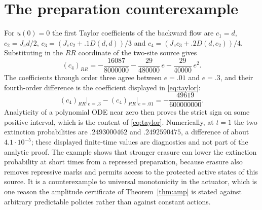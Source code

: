 \section{The preparation counterexample}
\label{app:taylor}

For $u(0)=0$ the first Taylor coefficients of the backward flow are $c_1=d$,
$c_2=J_ed/2$, $c_3=(J_ec_2+.1D(d,d))/3$ and $c_4=(J_ec_3+.2D(d,c_2))/4$.
Substituting in the $RR$ coordinate of the two-site source gives
\[
 (c_4)_{RR}=-\frac{16087}{8000000}-\frac{29}{480000}\,e
            -\frac{29}{40000}\,e^2 .
\]
The coefficients through order three agree between $e=.01$ and $e=.3$, and
their fourth-order difference is the coefficient displayed in
\eqref{eq:taylor}:
\[
 (c_4)_{RR}\big|_{e=.3}-(c_4)_{RR}\big|_{e=.01}
 =-\frac{49619}{600000000}.
\]
Analyticity of a polynomial ODE near zero then proves the strict sign on some
positive interval, which is the content of \eqref{eq:taylor}. Numerically, at
$t=1$ the two extinction probabilities are $.2493000462$ and $.2492590475$, a
difference of about $4.1\cdot10^{-5}$; these displayed finite-time values are
diagnostics and not part of the analytic proof. The example shows that stronger
erasure can lower the extinction probability at short times from a
repressed preparation, because erasure also removes repressive marks and
permits access to the protected active states of this source. It is a
counterexample to universal monotonicity in the actuator, which is one reason
the amplitude certificate of Theorem~\ref{thm:amp} is stated against arbitrary
predictable policies rather than against constant actions.

